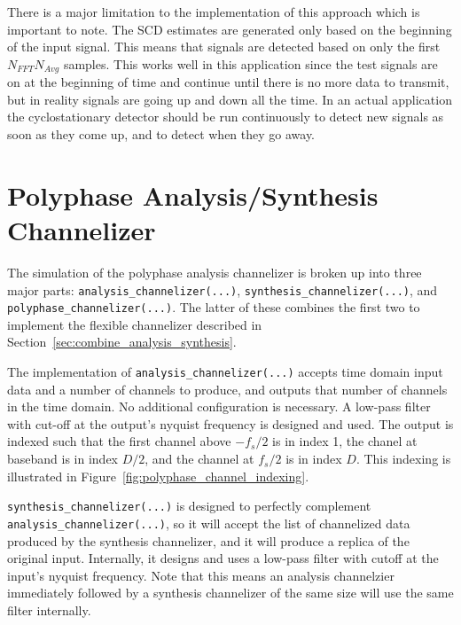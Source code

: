 \documentclass[12pt]{report}
\begin{document}
There is a major limitation to the implementation of this approach which is
important to note.  The SCD estimates are generated only based on the beginning
of the input signal. This means that signals are detected based on only the
first $N_{FFT}N_{Avg}$ samples. This works well in this application
since the test signals are on at the beginning of time and continue until there
is no more data to transmit, but in reality signals are going up and down
all the time. In an actual application the cyclostationary detector should be
run continuously to detect new signals as soon as they come up, and to detect
when they go away.

\section{Polyphase Analysis/Synthesis Channelizer}
\label{sec:sim_poly}
The simulation of the polyphase analysis channelizer is broken up into three
major parts: \texttt{analysis\_channelizer(...)},
\texttt{synthesis\_channelizer(...)}, and \texttt{polyphase\_channelizer(...)}.  The
latter of these combines the first two to implement the flexible channelizer
described in Section~\ref{sec:combine_analysis_synthesis}.

The implementation of \texttt{analysis\_channelizer(...)} accepts time domain
input data and a number of channels to produce, and outputs that number of
channels in the time domain. No additional configuration is necessary.
A low-pass filter with cut-off at the output's nyquist frequency is designed and
used. The output is indexed such that the first channel above $-f_s/2$ is in
index 1, the chanel at baseband is in index $D/2$, and the channel at $f_s/2$
is in index $D$.  This indexing is illustrated in
Figure~\ref{fig:polyphase_channel_indexing}.


\texttt{synthesis\_channelizer(...)} is designed to perfectly complement
\texttt{analysis\_channelizer(...)}, so it will accept the list of channelized
data produced by the synthesis channelizer, and it will produce a replica of
the original input. Internally, it designs and uses a low-pass filter with
cutoff at the input's nyquist frequency. Note that this means an analysis
channelzier immediately followed by a synthesis channelizer of the same size
will use the same filter internally.

\end{document}
